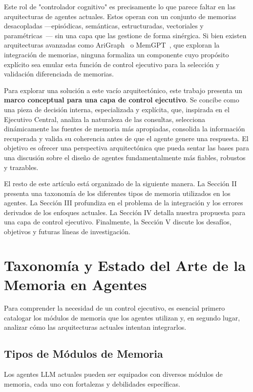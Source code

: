 \documentclass[conference]{IEEEtran}
\begin{document}
Este rol de "controlador cognitivo" es precisamente lo que parece faltar en las arquitecturas de agentes actuales. Estos operan con un conjunto de memorias desacopladas —episódicas, semánticas, estructuradas, vectoriales y paramétricas~\cite{zeng2024structural}— sin una capa que las gestione de forma sinérgica. Si bien existen arquitecturas avanzadas como AriGraph~\cite{anokhin2024arigraph} o MemGPT~\cite{packer2023memgpt}, que exploran la integración de memorias, ninguna formaliza un componente cuyo propósito explícito sea emular esta función de control ejecutivo para la selección y validación diferenciada de memorias.

Para explorar una solución a este vacío arquitectónico, este trabajo presenta un \textbf{marco conceptual para una capa de control ejecutivo}. Se concibe como una pieza de decisión interna, especializada y explícita, que, inspirada en el Ejecutivo Central, analiza la naturaleza de las consultas, selecciona dinámicamente las fuentes de memoria más apropiadas, consolida la información recuperada y valida su coherencia antes de que el agente genere una respuesta. El objetivo es ofrecer una perspectiva arquitectónica que pueda sentar las bases para una discusión sobre el diseño de agentes fundamentalmente más fiables, robustos y trazables.

El resto de este artículo está organizado de la siguiente manera. La Sección II presenta una taxonomía de los diferentes tipos de memoria utilizados en los agentes. La Sección III profundiza en el problema de la integración y los errores derivados de los enfoques actuales. La Sección IV detalla nuestra propuesta para una capa de control ejecutivo. Finalmente, la Sección V discute los desafíos, objetivos y futuras líneas de investigación.


\section{Taxonomía y Estado del Arte de la Memoria en Agentes}
\label{sec:memory_types}

Para comprender la necesidad de un control ejecutivo, es esencial primero catalogar los módulos de memoria que los agentes utilizan y, en segundo lugar, analizar cómo las arquitecturas actuales intentan integrarlos.

\subsection{Tipos de Módulos de Memoria}
Los agentes LLM actuales pueden ser equipados con diversos módulos de memoria, cada uno con fortalezas y debilidades específicas.
\end{document}
